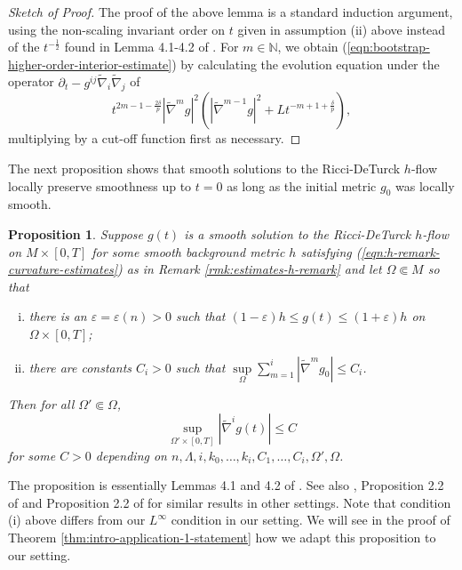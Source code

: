 \documentclass[12pt]{amsart}
\theoremstyle{plain}
\theoremstyle{plain}
\newtheorem{proposition}[subsection]{Proposition}
\theoremstyle{definition}
\theoremstyle{remark}
\numberwithin{equation}{subsection}
\newcommand{\hdel}{\tilde{\nabla}}
\begin{document}
\begin{proof}[Sketch of Proof]
    The proof of the above lemma is a standard induction argument, using the non-scaling invariant order on $t$ given in assumption (ii) above instead of the $t^{-\frac{1}{2}}$ found in Lemma 4.1-4.2 of \cite{simon_deformation_2002}. For $m \in \mathbb{N}$, we obtain (\ref{eqn:bootstrap-higher-order-interior-estimate}) by calculating the evolution equation under the operator $\partial_t - g^{ij}\hdel_i\hdel_j$ of 
    \begin{equation*}
        t^{2m-1-\frac{2\delta}{p}}|\hdel^m g|^2\left(|\hdel^{m-1}g|^2 + Lt^{-m+1+\frac{\delta}{p}}\right),
    \end{equation*}
    multiplying by a cut-off function first as necessary.
\end{proof}

The next proposition shows that smooth solutions to the Ricci-DeTurck $h$-flow locally preserve smoothness up to $t=0$ as long as the initial metric $g_0$ was locally smooth.

\begin{proposition}\label{prop:time-zero-smoothness}
    Suppose $g(t)$ is a smooth solution to the Ricci-DeTurck $h$-flow on $M \times [0,T]$ for some smooth background metric $h$ satisfying (\ref{eqn:h-remark-curvature-estimates}) as in Remark \ref{rmk:estimates-h-remark} and let $\Omega \Subset M$ so that
    \begin{enumerate}[(i)]
        \item there is an $\varepsilon = \varepsilon(n) > 0$ such that $(1-\varepsilon)h \leq g(t) \leq (1+\varepsilon)h$ on $\Omega\times[0,T]$;
        \item there are constants $C_i > 0$ such that $\sup\limits_{\Omega}\sum\limits_{m=1}^i |\hdel^m g_0|\leq C_i$.
    \end{enumerate}
    Then for all $\Omega' \Subset \Omega$,
    \begin{equation*}
        \sup\limits_{\Omega' \times [0,T]} |\hdel^i g(t)| \leq C
    \end{equation*}
    for some $C > 0$ depending on $n, \Lambda, i, k_0, \dots, k_i, C_1, \dots, C_i, \Omega', \Omega$.
\end{proposition}

The proposition is essentially Lemmas 4.1 and 4.2 of \cite{shi_deforming_1989}. See also \cite{simon_deformation_2002}, Proposition 2.2 of \cite{lee_continuous_2021} and Proposition 2.2 of \cite{chu_ricci-deturck_2022} for similar results in other settings. Note that condition (i) above differs from our $L^\infty$ condition in our setting. We will see in the proof of Theorem \ref{thm:intro-application-1-statement} how we adapt this proposition to our setting.
\end{document}
